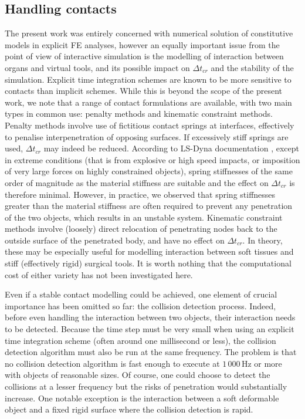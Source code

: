 	\subsection{Handling contacts}
The present work was entirely concerned with numerical solution of constitutive models in explicit FE analyses, however an equally important issue from the point of view of interactive simulation is the modelling of interaction between organs and virtual tools, and its possible impact on $ \Delta t_{cr} $ and the stability of the simulation. Explicit time integration schemes are known to be more sensitive to contacts than implicit schemes. While this is beyond the scope of the present work, we note that a range of contact formulations are available, with two main types in common use: penalty methods and kinematic constraint methods. Penalty methods involve use of fictitious contact springs at interfaces, effectively to penalise interpenetration of opposing surfaces. If excessively stiff springs are used, $ \Delta t_{cr} $ may indeed be reduced. \ON According to LS-Dyna documentation \citep{Hallquist06},  \OFF except in extreme conditions (that is from explosive or high speed impacts, or imposition of very large forces on highly constrained objects), spring stiffnesses of the same order of magnitude as the material stiffness are suitable and the effect on $ \Delta t_{cr} $ is therefore minimal. \ON However, in practice, we observed that spring stiffnesses greater than the material stiffness are often required to prevent any penetration of the two objects, which results in an unstable system. \OFF Kinematic constraint methods involve (loosely) direct relocation of penetrating nodes back to the outside surface of the penetrated body, and have no effect on $ \Delta t_{cr} $. \ON In theory, \OFF these may be especially useful for modelling interaction between soft tissues and stiff (effectively rigid) surgical tools. \ON It is worth nothing that \OFF the computational cost of either variety has not been investigated here. 

\ON
Even if a stable contact modelling could be achieved, one element of crucial importance has been omitted so far: the collision detection process. Indeed, before even handling the interaction between two objects, their interaction needs to be detected. Because the time step must be very small when using an explicit time integration scheme (often around one millisecond or less), the collision detection algorithm must also be run at the same frequency. The problem is that no collision detection algorithm is fast enough to execute at $ 1\,000\,$Hz or more with objects of reasonable sizes. Of course, one could choose to detect the collisions at a lesser frequency but the risks of penetration would substantially increase. One notable exception is the interaction between a soft deformable object and a fixed rigid surface where the collision detection is rapid. 

